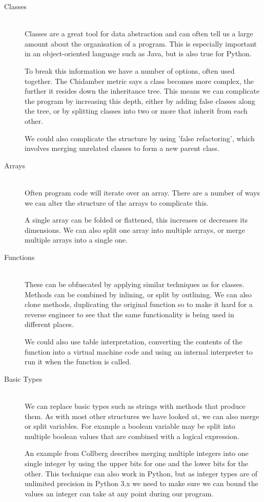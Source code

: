 \documentclass{report}
\begin{document}
\begin{description}
\item[Classes] \hfill \\
Classes are a great tool for data abstraction and can often tell us a large amount about the organisation of a program. This is
especially important in an object-oriented language such as Java, but is also true for Python.

To break this information we have a number of options, often used together. The Chidamber metric says a class becomes more complex,
the further it resides down the inheritance tree. This means we can complicate the program by increasing this depth, either by adding
false classes along the tree, or by splitting classes into two or more that inherit from each other.

We could also complicate the structure by using 'false refactoring', which involves merging unrelated classes to form a new parent
class.

\item[Arrays] \hfill \\
Often program code will iterate over an array. There are a number of ways we can alter the structure of the arrays to complicate
this.

A single array can be folded or flattened, this increases or decreases its dimensions. We can also split one array into multiple
arrays, or merge multiple arrays into a single one.

\item[Functions] \hfill \\
These can be obfuscated by applying similar techniques as for classes. Methods can be combined by inlining, or split by outlining.
We can also clone methods, duplicating the original function so to make it hard for a reverse engineer to see that the same
functionality is being used in different places.

We could also use table interpretation, converting the contents of the function into a virtual machine code and using an internal
interpreter to run it when the function is called.

\item[Basic Types] \hfill \\
We can replace basic types such as strings with methods that produce them. As with most other structures we have looked at, we can
also merge or split variables. For example a boolean variable may be split into multiple boolean values that are combined with a
logical expression.

An example from Collberg describes merging multiple integers into one single integer by using the upper bits for one and the lower
bits for the other. This technique can also work in Python, but as integer types are of unlimited precision \cite{intprec} in Python
3.x we need to make sure we can bound the values an integer can take at any point during our program.

\end{description}
\end{document}

